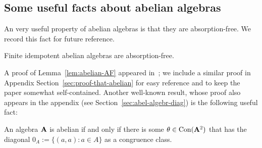
\subsection{Some useful facts about abelian algebras}
\label{sec:facts-about-abelian}

An very useful property of abelian algebras is that they are absorption-free.
We record this fact for future reference.
\begin{lemma}
  \label{lem:abelian-AF}
  Finite idempotent abelian algebras are absorption-free.
\end{lemma}
A proof of Lemma~\ref{lem:abelian-AF} appeared in~\cite[Lem~4.1]{MR3374664};
we include a similar proof in Appendix Section~\ref{sec:proof-that-abelian} for easy
reference and to keep the paper somewhat self-contained.
Another well-known result, whose proof also appears in the appendix
(see Section~\ref{sec:abel-algebr-diag}) is the following useful fact:
\begin{lemma}
  \label{lem:diagonal-cong-class}
 An algebra $\mathbf{A}$ is abelian if and only if there is some 
 $\theta \in \operatorname{Con} (\mathbf{A}^2)$ that has the diagonal $0_A:= \{(a,a): a \in A\}$ 
 as a congruence class.
\end{lemma}



